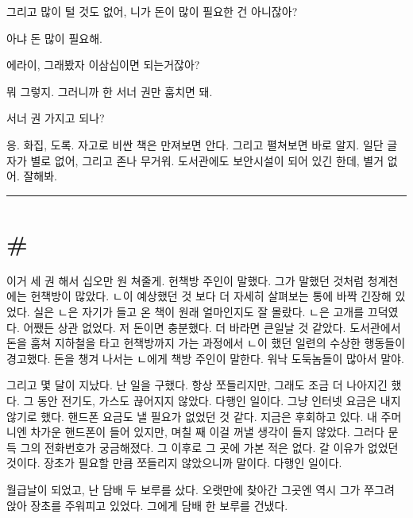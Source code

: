 \documentclass[a5paper,10pt, twoside, openright]{memoir}
\begin{document}
	그리고 많이 털 것도 없어, 니가 돈이 많이 필요한 건 아니잖아? 

	아냐 돈 많이 필요해. 
	
	에라이, 그래봤자 이삼십이면 되는거잖아?
	
	뭐 그렇지. 그러니까 한 서너 권만 훔치면 돼.
	
	서너 권 가지고 되나? 

	응. 화집, 도록. 자고로 비싼 책은 만져보면 안다. 그리고 펼쳐보면 바로 알지. 일단 글자가 별로 없어, 그리고 존나 무거워. 도서관에도 보안시설이 되어 있긴 한데, 별거 없어. 잘해봐. 
	
	\clearpage{}
		\savepagenumber
		\pagestyle{empty} 
	\rule[0pt]{\textwidth}{\textheight}
	

	\clearpage{}
		\restorepagenumber
		\pagestyle{plain}

	\section{\#}
	이거 세 권 해서 십오만 원 쳐줄게. 헌책방 주인이 말했다. 그가 말했던 것처럼 청계천에는 헌책방이 많았다. ㄴ이 예상했던 것 보다 더 자세히 살펴보는 통에 바짝 긴장해 있었다. 실은 ㄴ은 자기가 들고 온 책이 원래 얼마인지도 잘 몰랐다. ㄴ은 고개를 끄덕였다. 어쨌든 상관 없었다. 저 돈이면 충분했다. 더 바라면 큰일날 것 같았다. 도서관에서 돈을 훔쳐 지하철을 타고 헌책방까지 가는 과정에서 ㄴ이 했던 일련의 수상한 행동들이 경고했다. 돈을 챙겨 나서는 ㄴ에게 책방 주인이 말한다. 워낙 도둑놈들이 많아서 말야. 

	그리고 몇 달이 지났다. 난 일을 구했다. 항상 쪼들리지만, 그래도 조금 더 나아지긴 했다. 그 동안 전기도, 가스도 끊어지지 않았다. 다행인 일이다. 그냥 인터넷 요금은 내지 않기로 했다. 핸드폰 요금도 낼 필요가 없었던 것 같다. 지금은 후회하고 있다. 내 주머니엔 차가운 핸드폰이 들어 있지만, 며칠 째 이걸 꺼낼 생각이 들지 않았다. 그러다 문득 그의 전화번호가 궁금해졌다. 그 이후로 그 곳에 가본 적은 없다. 갈 이유가 없었던 것이다. 장초가 필요할 만큼 쪼들리지 않았으니까 말이다. 다행인 일이다. 

	월급날이 되었고, 난 담배 두 보루를 샀다. 오랫만에 찾아간 그곳엔 역시 그가 쭈그려 앉아 장초를 주워피고 있었다. 그에게 담배 한 보루를 건냈다. 
\end{document}
